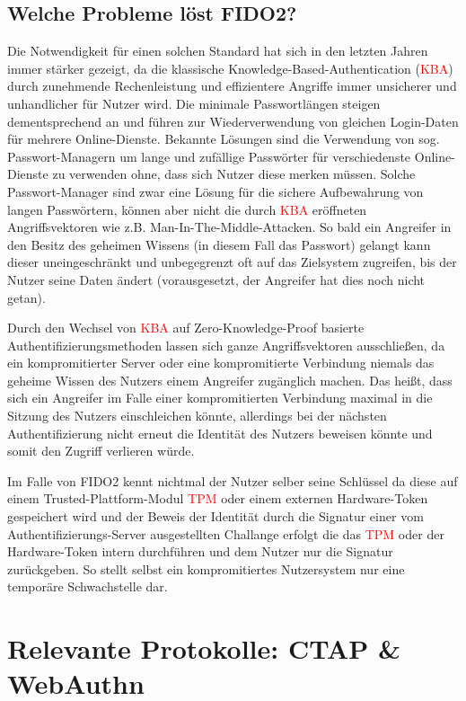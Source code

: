 \documentclass[journal]{IEEEtran}
\begin{document}
\subsection{Welche Probleme löst FIDO2?}

Die Notwendigkeit für einen solchen Standard hat sich in den letzten Jahren
immer stärker gezeigt, da die klassische Knowledge-Based-Authentication
(\textcolor{red}{KBA})
durch zunehmende Rechenleistung und effizientere Angriffe immer unsicherer und
unhandlicher für Nutzer wird. Die minimale Passwortlängen steigen
dementsprechend an und führen zur Wiederverwendung von gleichen Login-Daten für
mehrere Online-Dienste. Bekannte Lösungen sind die Verwendung von sog.
Passwort-Managern um lange und zufällige Passwörter für verschiedenste
Online-Dienste zu verwenden ohne, dass sich Nutzer diese merken müssen. Solche
Passwort-Manager sind zwar eine Lösung für die sichere Aufbewahrung von langen
Passwörtern, können aber nicht die durch \textcolor{red}{KBA} eröffneten
Angriffsvektoren wie z.B. Man-In-The-Middle-Attacken. So bald ein Angreifer
in den Besitz des geheimen Wissens (in diesem Fall das Passwort) gelangt kann
dieser uneingeschränkt und unbegegrenzt oft auf das Zielsystem zugreifen, bis
der Nutzer seine Daten ändert (vorausgesetzt, der Angreifer hat dies noch nicht
getan).

Durch den Wechsel von \textcolor{red}{KBA} auf Zero-Knowledge-Proof basierte
Authentifizierungsmethoden lassen sich ganze Angriffsvektoren ausschließen, da
ein kompromitierter Server oder eine kompromitierte Verbindung niemals das
geheime Wissen des Nutzers einem Angreifer zugänglich machen. Das heißt, dass
sich ein Angreifer im Falle einer kompromitierten Verbindung maximal in die
Sitzung des Nutzers einschleichen könnte, allerdings bei der nächsten
Authentifizierung nicht erneut die Identität des Nutzers beweisen könnte und
somit den Zugriff verlieren würde.

Im Falle von FIDO2 kennt nichtmal der Nutzer selber seine Schlüssel da diese
auf einem Trusted-Plattform-Modul \textcolor{red}{TPM} oder einem externen
Hardware-Token gespeichert wird und der Beweis der Identität durch die Signatur
einer vom Authentifizierungs-Server ausgestellten Challange erfolgt die das
\textcolor{red}{TPM} oder der Hardware-Token intern durchführen und dem Nutzer
nur die Signatur zurückgeben. So stellt selbst ein kompromitiertes Nutzersystem
nur eine temporäre Schwachstelle dar.


\section{Relevante Protokolle: CTAP \& WebAuthn}
\end{document}
